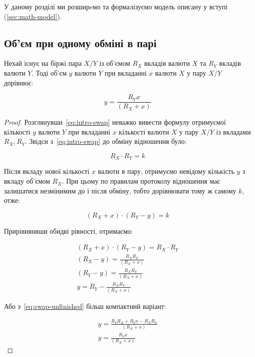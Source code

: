 \documentclass[../index.tex]{subfiles}
\begin{document}
У даному розділі ми розширeмо та формалізуємо модель описану у вступі
(\ref{sec:math-model}).

\subsection{Об'єм при одному обміні в парі}

\begin{lemma} Нехай існує на біржі пара \(X/Y\) із об'ємом \(R_{X}\) вкладів
	валюти \(X\) та \(R_{Y}\) вкладів валюти \(Y\). Тоді об'єм \(y\) валюти \(Y\)
	при вкладанні \(x\) валюти \(X\) у пару \(X/Y\) дорівнює:

	\begin{equation}\label{eq:swap}
		y = \frac{R_{Y}x}{(R_{X} + x)}
	\end{equation}
\end{lemma}

\begin{proof}
	Розглянувши~\eqref{eq:intro-swap} неважко вивести формулу отримуємої кількості
	\(y\) валюти \(Y\) при вкладанні \(x\) кількості валюти \(X\) у пару \(X/Y\)
	із вкладами \(R_{X}, R_{Y}\). Звідси з~\eqref{eq:intro-swap} до обміну
	відношення було:

	\begin{equation*}
		R_{X} \cdot R_{Y} = k
	\end{equation*}

	Після вкладу нової кількості \(x\) валюти в пару, отримуємо невідому кількість
	\(y\) з вкладу об'ємом \(R_{X}\). При цьому по правилам протоколу
	відношення має залишатися незмінимим до і після обміну, тобто дорівнювати тому
	ж самому \(k\), отже:

	\begin{equation*}
		(R_{X} + x) \cdot (R_{Y} - y) = k
	\end{equation*}

	Прирівнянвши обидві рівності, отримаємо:

	\begin{equation}\label{eq:swap-unfinished}
		\begin{aligned}
			(R_{X} + x) \cdot (R_{Y} - y) = R_{X} \cdot R_{Y} \\
			(R_{X} - y) = \frac{R_{X} R_{Y}}{(R_{X} + x)}         \\
			(R_{Y} - y) = \frac{R_{X} R_{Y}}{(R_{X} + x)}     \\
			y = R_{Y} - \frac{R_{X} R_{Y}}{(R_{X} + x)}
		\end{aligned}
	\end{equation}

	Або з~\eqref{eq:swap-unfinished} більш компактний варіант:

	\begin{equation}
		\begin{aligned}
			y = \frac{R_{Y} R_{X} + R_{Y}x - R_{X}R_{Y}}{(R_{X} + x)} \\
			y = \frac{R_{Y}x}{(R_{X} + x)}
		\end{aligned}
	\end{equation}
\end{proof}
\end{document}
